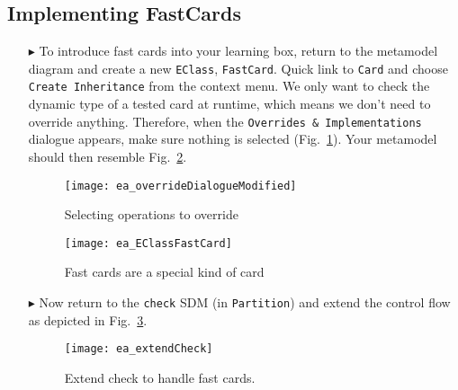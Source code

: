 \newpage
\subsection{Implementing FastCards}
\visHeader
\hypertarget{fastCard vis}{}

\begin{itemize}

\item[$\blacktriangleright$] To introduce fast cards into your learning box, return to the metamodel diagram and create a new \texttt{EClass},
\texttt{FastCard}. Quick link to \texttt{Card} and choose \texttt{Create Inheritance} from the context menu. We only want to check the dynamic type of a
tested card at runtime, which means we don't need to override anything. Therefore, when the \texttt{Overrides \& Implementations} dialogue appears, make sure
nothing is selected (Fig.~\ref{ea:dialogue_override}). Your metamodel should then resemble Fig.~\ref{ea:metamodel_FastCard}.

\vspace{0.5cm}

\begin{figure}[htp]
\begin{center}
  \texttt{[image: ea\_overrideDialogueModified]}
  \caption{Selecting operations to override}  
  \label{ea:dialogue_override}
\end{center}
\end{figure}

\begin{figure}[htp]
\begin{center}
  \texttt{[image: ea\_EClassFastCard]}
  \caption{Fast cards are a special kind of card}  
  \label{ea:metamodel_FastCard}
\end{center}
\end{figure}

\vspace{0.5cm}

\item[$\blacktriangleright$] Now return to the \texttt{check} SDM (in \texttt{Partition}) and extend the control flow as depicted in
Fig.~\ref{ea:extendCheck}.

 \vspace{0.5cm}
 
\begin{figure}[htbp]
\begin{center}
  \texttt{[image: ea\_extendCheck]}
  \caption{Extend check to handle fast cards.}  
  \label{ea:extendCheck}
\end{center}
\end{figure}
 


\end{itemize}
